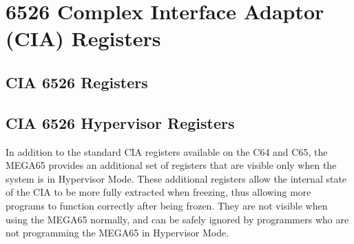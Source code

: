 \chapter{6526 Complex Interface Adaptor (CIA) Registers}

\section{CIA 6526 Registers}




\section{CIA 6526 Hypervisor Registers}

In addition to the standard CIA registers available on the C64 and C65, the MEGA65
provides an additional set of registers that are visible only when the system is in
Hypervisor Mode. These additional registers allow the internal state of the CIA to
be more fully extracted when freezing, thus allowing more programs to function
correctly after being frozen.  They are not visible when using the MEGA65 normally,
and can be safely ignored by programmers who are not programming the MEGA65 in
Hypervisor Mode.




